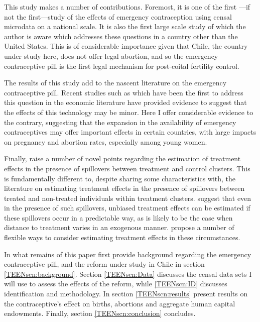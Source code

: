 This study makes a number of contributions.  Foremost, it is one of the first%
---if not the first---study of the effects of emergency contraception using 
censal microdata on a national scale.  It is also the first large scale study 
of which the author is aware which addresses these questions in a country other 
than the United States.  This is of considerable importance given that Chile, 
the country under study here, does not offer legal abortion, and so the 
emergency contraceptive pill is the first legal mechanism for post-coital 
fertility control.

The results of this study add to the nascent literature on the emergency 
contraceptive pill.  Recent studies such as \citet{Grossetal2012, Durrance2013} 
which have been the first to address this question in the economic literature
have provided evidence to suggest that the effects of this technology may be 
minor.  Here I offer considerable evidence to the contrary, suggesting
that the expansion in the availability of emergency contraceptives may offer 
important effects in certain countries, with large impacts on pregnancy and 
abortion rates, especially among young women.

Finally, \person raise a number of novel points regarding the estimation of 
treatment effects in the presence of spillovers between treatment and control
clusters.  This is fundamentally different to, despite sharing some 
characteristics with, the literature on estimating treatment effects in the 
presence of spillovers between treated and non-treated individuals within 
treatment clusters.  \Person suggest that even in the presence of such 
spillovers, unbiased treatment effects can be estimated if these spillovers
occur in a predictable way, as is likely to be the case when distance to 
treatment varies in an exogenous manner. \Person propose a number of flexible
ways to consider estimating treatment effects in these circumstances.

In what remains of this paper \person first provide background regarding the
emergency contraceptive pill, and the reform under study in Chile in section
\ref{TEENscn:background}.  Section \ref{TEENscn:Data} discusses the censal data 
sets I will use to assess the effects of the reform, while \ref{TEENscn:ID} 
discusses identification and methodology.  In section \ref{TEENscn:results} 
\person present results on the contraceptive's effect on births, abortions and 
aggregate human capital endowments.  Finally, section \ref{TEENscn:conclusion} 
concludes.

